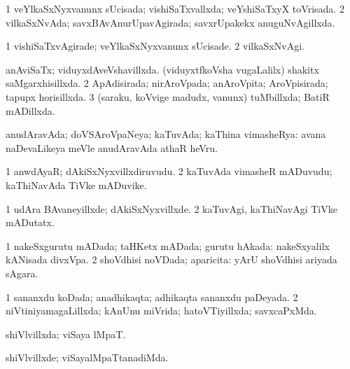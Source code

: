 {\bentry
{} 
\gl{\gu}
\expl{}
\bmng
\bnum
\num{1} veYlkaSxNyxvanunx sUcisada; vishiSaTxvallxda; veYshiSaTxyX toVrisada. 
\num{2} vilkaSxNvAda; savxBAvAnurUpavAgirada; savxrUpakekx anuguNvAgillxda. 
\enum
\emng
\eentry

\bentry
{} 
\gl{\kirxvi}
\expl{}
\bmng
\bnum
\num{1} vishiSaTxvAgirade; veYlkaSxNyxvanunx sUcisade. 
\num{2} vilkaSxNvAgi. 
\enum
\emng
\eentry

\bentry
{} 
\gl{\gu}
\expl{}
\bmng
\bnum
{} 
\banum
{} anAviSaTx; viduyxdAveVshavillxda. 
 (viduyxtfkoVsha \mo vugaLalilx) shakitx saMgarxhisillxda. 
\eanum
\numie
\num{2} ApAdisirada; nirAroVpada; anAroVpita; AroVpisirada; tapupx horisillxda. 
\num{3} (saraku, koVvige madudx, \mo vanunx) tuMbillxda; BatiR mADillxda. 
\enum
\emng
\eentry

\bentry
{} 
\gl{\gu}
\expl{}
\bmng
anudAravAda; doVSAroVpaNeya; kaTuvAda; kaThina vimasheRya:  avana naDevaLikeya meVle anudAravAda athaR heVru. 
\emng
\eentry

\bentry
{} 
\gl{\nA}
\expl{}
\bmng
\bnum
\num{1} anwdAyaR; dAkiSxNyxvillxdiruvudu. 
\num{2} kaTuvAda vimasheR mADuvudu; kaThiNavAda TiVke mADuvike. 
\enum
\emng
\eentry

\bentry
{} 
\gl{\kirxvi}
\expl{}
\bmng
\bnum
\num{1} udAra BAvaneyillxde; dAkiSxNyxvillxde. 
\num{2} kaTuvAgi, kaThiNavAgi TiVke mADutatx. 
\enum
\emng
\eentry

\bentry
{} 
\gl{\gu}
\expl{}
\bmng
\bnum
\num{1} nakeSxgurutu mADada; taHKetx mADada; gurutu hAkada:  nakeSxyalilx kANisada divxVpa. 
\num{2} shoVdhisi noVDada; aparicita:  yArU shoVdhisi ariyada sAgara. 
\enum
\emng
\eentry

\bentry
{} 
\gl{\gu}
\expl{}
\bmng
\bnum
\num{1} sananxdu koDada; anadhikaqta; adhikaqta sananxdu paDeyada. 
\num{2} niVtiniyamagaLillxda; kAnUnu miVrida; hatoVTiyillxda; savxcaPxMda. 
\enum
\emng
\eentry

\bentry
{} 
\gl{\gu}
\expl{}
\bmng
shiVlvillxda; viSaya lMpaT. 
\emng
\eentry

\bentry
{} 
\gl{\kirxvi}
\expl{}
\bmng
shiVlvillxde; viSayalMpaTtanadiMda. 
\emng
\eentry

}
